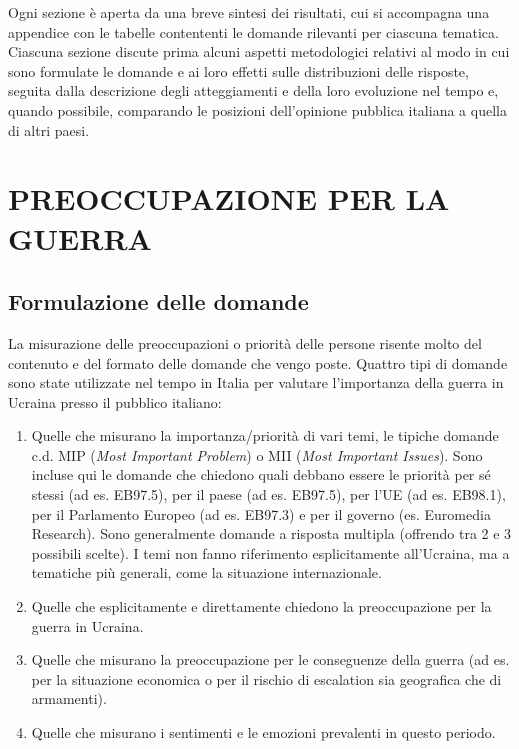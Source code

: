\documentclass[
]{book}
\begin{document}
Ogni sezione è aperta da una breve sintesi dei risultati, cui si accompagna una appendice con le tabelle contententi le domande rilevanti per ciascuna tematica. Ciascuna sezione discute prima alcuni aspetti metodologici relativi al modo in cui sono formulate le domande e ai loro effetti sulle distribuzioni delle risposte, seguita dalla descrizione degli atteggiamenti e della loro evoluzione nel tempo e, quando possibile, comparando le posizioni dell'opinione pubblica italiana a quella di altri paesi.

\hypertarget{preoccupazione-per-la-guerra}{%
\chapter{PREOCCUPAZIONE PER LA GUERRA}\label{preoccupazione-per-la-guerra}}

\hypertarget{formulazione-delle-domande}{%
\section{Formulazione delle domande}\label{formulazione-delle-domande}}

La misurazione delle preoccupazioni o priorità delle persone risente molto del contenuto e del formato delle domande che vengo poste. Quattro tipi di domande sono state utilizzate nel tempo in Italia per valutare l'importanza della guerra in Ucraina presso il pubblico italiano:

\begin{enumerate}
\def\labelenumi{\alph{enumi})}
\item
  Quelle che misurano la importanza/priorità di vari temi, le tipiche domande c.d. MIP (\emph{Most Important Problem}) o MII (\emph{Most Important Issues}). Sono incluse qui le domande che chiedono quali debbano essere le priorità per sé stessi (ad es. EB97.5), per il paese (ad es. EB97.5), per l'UE (ad es. EB98.1), per il Parlamento Europeo (ad es. EB97.3) e per il governo (es. Euromedia Research). Sono generalmente domande a risposta multipla (offrendo tra 2 e 3 possibili scelte). I temi non fanno riferimento esplicitamente all'Ucraina, ma a tematiche più generali, come la situazione internazionale.
\item
  Quelle che esplicitamente e direttamente chiedono la preoccupazione per la guerra in Ucraina.
\item
  Quelle che misurano la preoccupazione per le conseguenze della guerra (ad es. per la situazione economica o per il rischio di escalation sia geografica che di armamenti).
\item
  Quelle che misurano i sentimenti e le emozioni prevalenti in questo periodo.
\end{enumerate}
\end{document}
